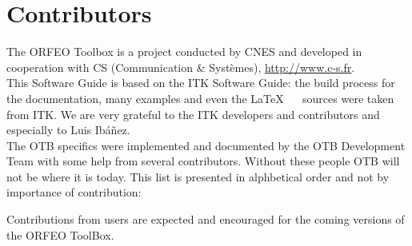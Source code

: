 \chapter{Contributors}
\noindent

The ORFEO Toolbox is a project conducted by CNES and developed in
cooperation with CS (Communication \& Syst\`{e}mes), \url{http://www.c-s.fr}.\\

This Software Guide is based on the ITK Software Guide: the build
process for the documentation, many examples and even the \LaTeX~ ~
sources were taken from ITK. We are very grateful to the ITK
developers and contributors and especially to Luis Ib\'a\~nez.\\

The OTB specifics were implemented and documented by the OTB Development Team
with some help from several contributors. Without these people OTB will not be
where it is today. This list is presented in alphbetical order and not by
importance of contribution:



Contributions from users are expected and encouraged for the coming
versions of the ORFEO ToolBox.

